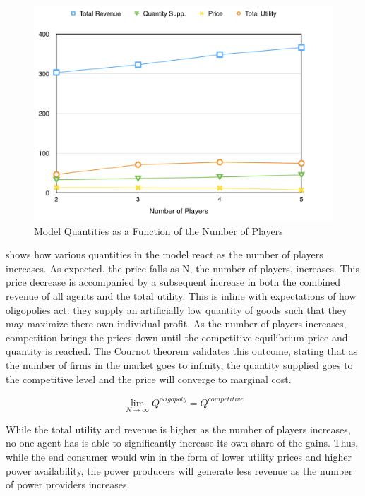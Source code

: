\documentclass[12pt]{article}
\begin{document}
	\begin{figure}[ht!]
		\begin{center}
		\includegraphics[scale = .35]{numP.png}
		\caption{Model Quantities as a Function of the Number of Players}
		\label{numP}
		\end{center}
	\end{figure}

 shows how various quantities in the model react as the number of players increases. As expected, the price falls as N, the number of players, increases. This price decrease is accompanied by a subsequent increase in both the combined revenue of all agents and the total utility. This is inline with expectations of how oligopolies act: they  supply an artificially low quantity of goods such that they may maximize there own individual profit. As the number of players increases, competition brings the prices down until the competitive equilibrium price and quantity is reached. The Cournot theorem validates this outcome, stating that as the number of firms in the market goes to infinity, the quantity supplied goes to the competitive level and the price will converge to marginal cost.

	\begin{equation}
		\lim_{N\to\infty} Q^{oligopoly} = Q^{competitive}
	\end{equation}

While the total utility and revenue is higher as the number of players increases, no one agent has is able to significantly increase its own share of the gains. Thus, while the end consumer would win in the form of lower utility prices and higher power availability, the power producers will generate less revenue as the number of power providers increases. \*
\end{document}
